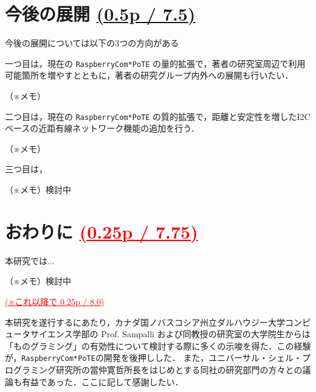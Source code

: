 {\section{今後の展開 \small{\underline{(0.5p / 7.5)}}}
\vspace{-0.5zh}
\label{sec:07nextstep}

今後の展開については以下の3つの方向がある

一つ目は，現在の {\tt Raspberry\-Com*PoTE} の量的拡張で，著者の研究室周辺で利用可能箇所を増やすとともに，著者の研究グループ内外への展開も行いたい．

（※メモ）

二つ目は，現在の {\tt Raspberry\-Com*PoTE} の質的拡張で，距離と安定性を増したI2Cベースの近距有線ネットワーク機能の追加を行う．


（※メモ）

三つ目は，

（※メモ）検討中


\section{おわりに \textcolor{red}{\small{\underline{(0.25p / 7.75)}}}}
\vspace{-0.5zh}
\label{sec:07conclusion}

本研究では...


（※メモ）検討中


\textcolor{red}{\underline{(※これ以降で 0.25p / 8.0)}}\\

\vspace{-0.5zh}
\begin{acknowledgment}

  \begin{spacing}{0.85}
    \small{
      本研究を遂行するにあたり，カナダ国ノバスコシア州立ダルハウジー大学コンピュータサイエンス学部の Prof. Sampalli および同教授の研究室の大学院生からは「ものグラミング」の有効性について検討する際に多くの示唆を得た．この経験が，{\tt Raspberry\-Com*PoTE}の開発を後押しした．
      また，ユニバーサル・シェル・プログラミング研究所の當仲寛哲所長をはじめとする同社の研究部門の方々との議論も有益であった．ここに記して感謝したい．
    }
  \end{spacing}


\end{acknowledgment}}

